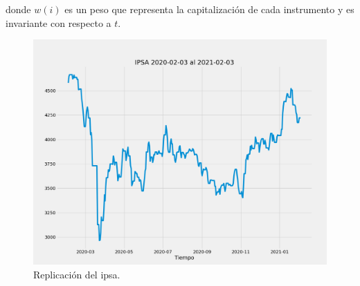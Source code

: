 \documentclass{article}
\begin{document}
    donde $w(i)$ es un peso que representa la capitalización de cada instrumento y es invariante 
    con respecto a $t$.

	\begin{figure}[H]
		\centering
		\includegraphics[scale=.25]{imgs/ipsa_replication.png}
		\caption{Replicación del ipsa.}
		\label{fig:ipsa_replication}
	\end{figure}
\end{document}
